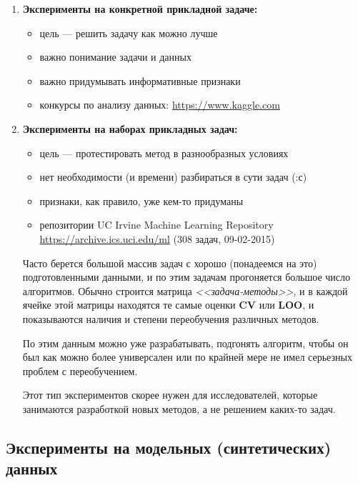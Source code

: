 \documentclass{article}
\begin{document}
\begin{enumerate}
\item \textbf{Эксперименты на конкретной прикладной задаче:}
	
	\begin{itemize}
	\item цель --- решить задачу как можно лучше
	\item важно понимание задачи и данных
	\item важно придумывать информативные признаки
	\item конкурсы по анализу данных: \textcolor{blue}{\url{https://www.kaggle.com}}
	\end{itemize}
	
	
\item \textbf{Эксперименты на наборах прикладных задач:}

	\begin{itemize}
	\item цель --- протестировать метод в разнообразных условиях
	\item нет необходимости (и времени) разбираться в сути задач (:с)
	\item признаки, как правило, уже кем-то придуманы
	\item репозитории UC Irvine Machine Learning Repository
		\textcolor{blue}{\url{https://archive.ics.uci.edu/ml}} (308 задач, 09-02-2015)
	\end{itemize}
	
	Часто берется большой массив задач с хорошо (понадеемся на это) подготовленными данными, и по этим задачам прогоняется большое число алгоритмов. Обычно строится матрица \textit{<<задача-методы>>}, и в каждой ячейке этой матрицы находятся те самые оценки \textbf{CV} или \textbf{LOO}, и показываются наличия и степени переобучения различных методов.
	
	По этим данным можно уже разрабатывать, подгонять алгоритм, чтобы он был как можно более универсален или по крайней мере не имел серьезных проблем с переобучением.
	
	Этот тип экспериментов скорее нужен для исследователей, которые занимаются разработкой новых методов, а не решением каких-то задач.
	
	\end{enumerate}
	
\subsection{Эксперименты на модельных (синтетических) данных}
\end{document}
